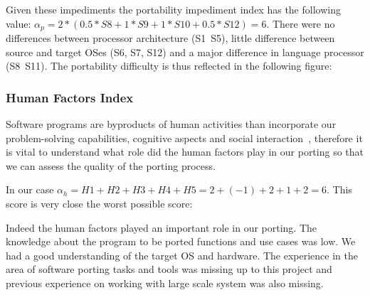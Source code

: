 Given these impediments the portability impediment index has the following
value: $\alpha_p = 2 * (0.5 * S8 + 1 * S9 + 1 * S10 + 0.5 * S12) = 6$.  There
were no differences between processor architecture (S1~S5), little difference
between source and target OSes (S6, S7, S12) and a major difference in language
processor (S8~S11). The portability difficulty is thus reflected in the
following figure:



\subsubsection{Human Factors Index}

Software programs are byproducts of human activities than incorporate our
problem-solving capabilities, cognitive aspects and social
interaction~\cite{b5}, therefore it is vital to understand what role did the
human factors play in our porting so that we can assess the quality of the
porting process. 

In our case $\alpha_h = H1 + H2 + H3 + H4 + H5 = 2 + (-1) + 2 + 1 + 2 = 6$.
This score is very close the worst possible score:


Indeed the human factors played an important role in our porting. The knowledge
about the program to be ported functions and use cases was low. We had a good
understanding of the target OS and hardware. The experience in the area of
software porting tasks and tools was missing up to this project and previous
experience on working with large scale system was also missing.


